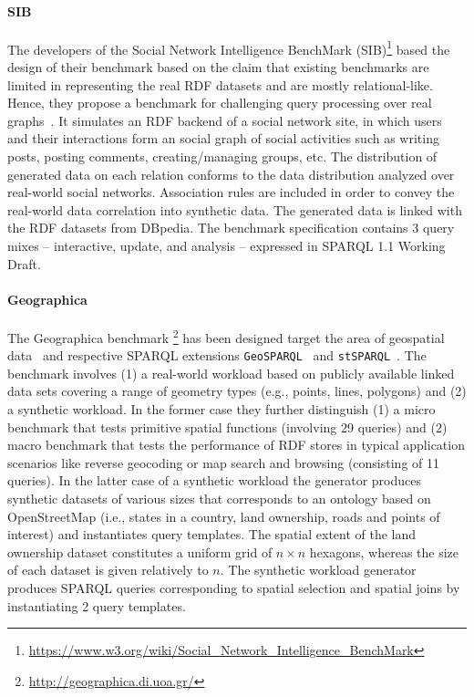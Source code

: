 \paragraph{SIB} The developers of the Social Network Intelligence BenchMark (SIB)\footnote{\url{https://www.w3.org/wiki/Social_Network_Intelligence_BenchMark}} based the design of their benchmark based on the claim that existing benchmarks are limited in representing the real RDF datasets and are mostly relational-like. Hence, they propose a benchmark for challenging query processing over real graphs~\cite{sib}. It simulates an RDF backend of a social network site, in which users and their interactions form an social graph of social activities such as writing posts, posting comments, creating/managing groups, etc. The distribution of generated data on each relation conforms to the data distribution analyzed over real-world social networks. Association rules are included in order to convey the real-world data correlation into synthetic data. The  generated data is linked with the RDF datasets from DBpedia. The benchmark specification contains 3 query mixes -- interactive, update, and analysis -- expressed in SPARQL 1.1 Working Draft.

\paragraph{Geographica} The Geographica benchmark \footnote{\url{http://geographica.di.uoa.gr/}} has been designed target the area of geospatial data~\cite{DBLP:conf/semweb/GarbisKK13} and respective SPARQL extensions \texttt{GeoSPARQL}~\cite{battle2012enabling} and \texttt{stSPARQL}~\cite{koubarakis2010modeling}. The benchmark involves (1) a real-world workload based on publicly available linked data sets covering a range of geometry types (e.g., points, lines, polygons) and (2) a synthetic workload. In the former case they further distinguish (1) a micro benchmark that tests primitive spatial functions (involving 29 queries) and (2) macro benchmark that tests the performance of RDF stores in typical application scenarios like reverse geocoding or map search and browsing (consisting of 11 queries). In the latter case of a synthetic workload the generator produces synthetic datasets of various sizes that corresponds to an ontology based on OpenStreetMap (i.e., states in a country, land ownership, roads and  points of interest) and instantiates query templates. The spatial extent of the land ownership dataset constitutes a uniform grid of $n \times n$ hexagons, whereas the size of each dataset is given relatively to $n$. The synthetic workload generator produces SPARQL queries corresponding to spatial selection and spatial joins by instantiating 2 query templates.



